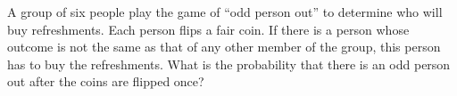 \documentclass[../main.tex]{subfiles}
\begin{document}
A group of six people play the game of ``odd person out'' to determine who will buy refreshments.
Each person flips a fair coin.
If there is a person whose outcome is not the same as that of any other member of the group, this person has to buy the refreshments.
What is the probability that there is an odd person out after the coins are flipped once?

\solution
\end{document}
